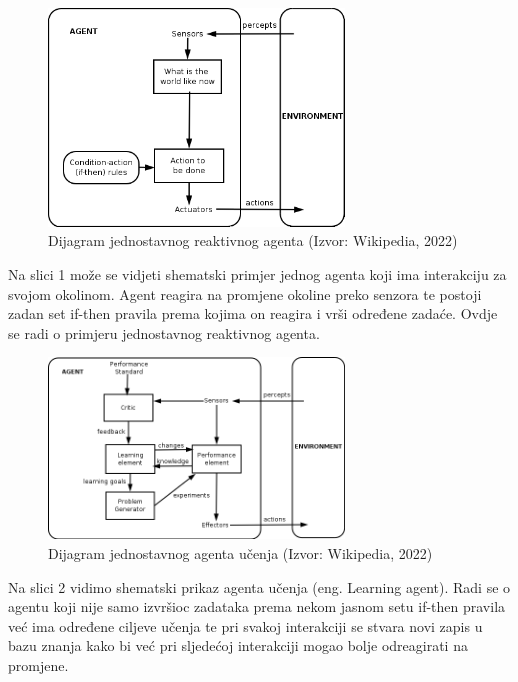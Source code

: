 \documentclass{foi}
\begin{document}
\begin{figure}[h!]
    \centering
    \includegraphics[width=0.7\textwidth]{slike/agentReakcije.png}
    \caption{Dijagram jednostavnog reaktivnog agenta (Izvor: Wikipedia, 2022)}
    \label{fig:dijagramAgenti}
\end{figure}

Na slici 1 može se vidjeti shematski primjer jednog agenta koji ima interakciju za svojom okolinom. Agent reagira na promjene okoline preko senzora te postoji zadan set if-then pravila prema kojima on reagira i vrši određene zadaće. Ovdje se radi o primjeru jednostavnog reaktivnog agenta. 

\begin{figure}[h!]
	\centering
	\includegraphics[width=0.7\textwidth]{slike/agentUcenja.png}
	\caption{Dijagram jednostavnog agenta učenja (Izvor: Wikipedia, 2022)}
	\label{fig:dijagramAgenti}
\end{figure}

Na slici 2 vidimo shematski prikaz agenta učenja (eng. Learning agent). Radi se o agentu koji nije samo izvršioc zadataka prema nekom jasnom setu if-then pravila već ima određene ciljeve učenja te pri svakoj interakciji se stvara novi zapis u bazu znanja kako bi već pri sljedećoj interakciji mogao bolje odreagirati na promjene.
\end{document}

